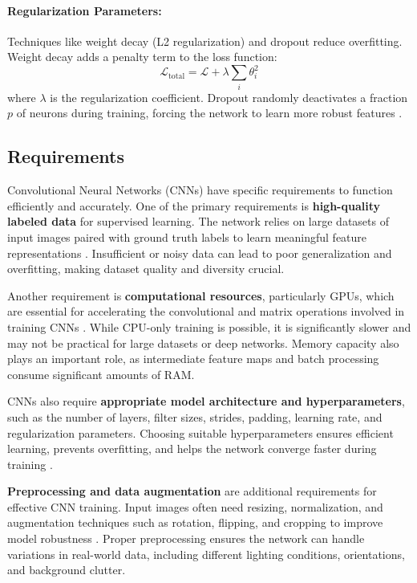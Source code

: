 \paragraph{Regularization Parameters:}  
Techniques like weight decay (L2 regularization) and dropout reduce overfitting. Weight decay adds a penalty term to the loss function:
\[
\mathcal{L}_{\text{total}} = \mathcal{L} + \lambda \sum_i \theta_i^2
\]
where \(\lambda\) is the regularization coefficient. Dropout randomly deactivates a fraction \(p\) of neurons during training, forcing the network to learn more robust features \cite{srivastava2014dropout}.

\subsection{Requirements}

Convolutional Neural Networks (CNNs) have specific requirements to function efficiently and accurately. One of the primary requirements is \textbf{high-quality labeled data} for supervised learning. The network relies on large datasets of input images paired with ground truth labels to learn meaningful feature representations \cite{goodfellow2016deep}. Insufficient or noisy data can lead to poor generalization and overfitting, making dataset quality and diversity crucial.

Another requirement is \textbf{computational resources}, particularly GPUs, which are essential for accelerating the convolutional and matrix operations involved in training CNNs \cite{pinto2022springer, pytorchdocs}. While CPU-only training is possible, it is significantly slower and may not be practical for large datasets or deep networks. Memory capacity also plays an important role, as intermediate feature maps and batch processing consume significant amounts of RAM.

CNNs also require \textbf{appropriate model architecture and hyperparameters}, such as the number of layers, filter sizes, strides, padding, learning rate, and regularization parameters. Choosing suitable hyperparameters ensures efficient learning, prevents overfitting, and helps the network converge faster during training \cite{krizhevsky2012imagenet, srivastava2014dropout}.

\textbf{Preprocessing and data augmentation} are additional requirements for effective CNN training. Input images often need resizing, normalization, and augmentation techniques such as rotation, flipping, and cropping to improve model robustness \cite{pinto2022springer}. Proper preprocessing ensures the network can handle variations in real-world data, including different lighting conditions, orientations, and background clutter.

